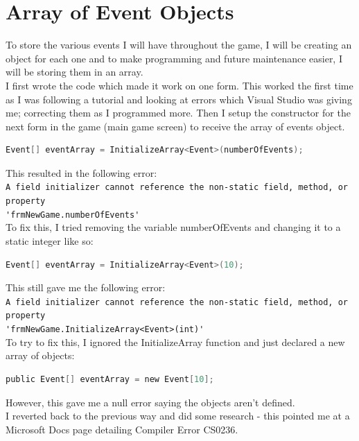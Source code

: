 \section{Array of Event Objects}
To store the various events I will have throughout the game, I will be creating an object for each one and to make programming and future maintenance easier, I will be storing them in an array.\\
I first wrote the code which made it work on one form. This worked the first time as I was following a tutorial and looking at errors which Visual Studio was giving me; correcting them as I programmed more. Then I setup the constructor for the next form in the game (main game screen) to receive the array of events object.
\begin{lstlisting}[language=c, style=csharp, caption=First attempt at declaring an array of objects]
Event[] eventArray = InitializeArray<Event>(numberOfEvents);
\end{lstlisting}
This resulted in the following error:\\
\verb|A field initializer cannot reference the non-static field, method, or property|\\ \verb|'frmNewGame.numberOfEvents'|\\
To fix this, I tried removing the variable numberOfEvents and changing it to a static integer like so:
\begin{lstlisting}[language=c, style=csharp, caption=Second attempt at declaring an array of objects]
Event[] eventArray = InitializeArray<Event>(10);
\end{lstlisting}
This still gave me the following error:\\
\verb|A field initializer cannot reference the non-static field, method, or property|\\ \verb|'frmNewGame.InitializeArray<Event>(int)'|\\
To try to fix this, I ignored the InitializeArray function and just declared a new array of objects:\\
\begin{lstlisting}[language=c, style=csharp, caption=Third attempt at declaring an array of objects]
public Event[] eventArray = new Event[10];
\end{lstlisting}
However, this gave me a null error saying the objects aren't defined.\\
I reverted back to the previous way and did some research - this pointed me at a Microsoft Docs page detailing Compiler Error CS0236.\\
